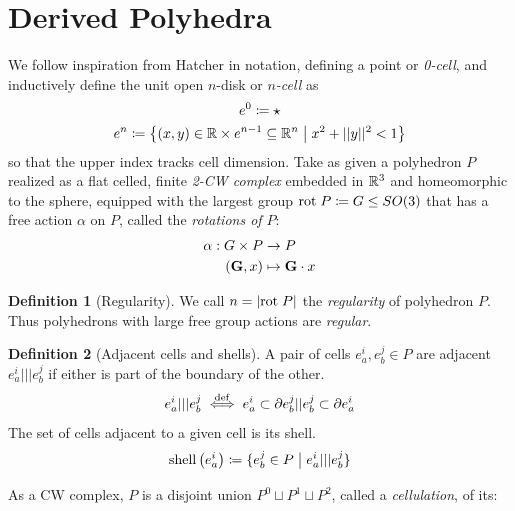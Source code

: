 \documentclass{amsart}
\theoremstyle{plain}
\theoremstyle{definition}
\newtheorem*{definition}{Definition}
\begin{document}
\section{Derived Polyhedra}

We follow inspiration from Hatcher \cite{MR1867354} in notation, defining a point or \emph{0-cell}, and inductively define  the unit open $n$-disk or \emph{$n$-cell} as
\begin{gather}
    e^0\coloneqq \star\\
    e^n\coloneqq \left\{(x,y)\in \mathbb{R}\times e^{n-1}\subseteq \mathbb{R}^n\hspace{1mm}\big|\hspace{1mm} x^2+||y||^2<1\right\}
\end{gather}
so that the upper index tracks cell dimension.
Take as given a polyhedron $P$ realized as a flat celled, finite \emph{2-CW complex} embedded in $\mathbb{R}^3$ and homeomorphic to the sphere, equipped with the largest group $\mathrm{rot}\hspace{1mm}P \coloneqq G\leq SO(3)$ that has a free action $\alpha$ on $P$, called the \emph{rotations of $P$}: 
\begin{align}
    \alpha:G\times P&\to P\\
    (\mathbf{G},x)&\mapsto \mathbf{G}\cdot x\nonumber
\end{align}
\begin{definition}[Regularity]
    We call $n=|\mathrm{rot}\hspace{1mm}P|$ the \emph{regularity} of polyhedron $P$. Thus polyhedrons with large free group actions are \emph{regular}.
\end{definition}
\begin{definition}[Adjacent cells and shells]
    A pair of cells $e^i_a, e^j_b\in P$ are adjacent $e^i_a ||| e^j_b$ if either is part of the boundary of the other.
    \begin{equation}
        e^i_a ||| e^j_b \overset{\mathrm{def}}{\iff} e^i_a \subset \partial e^j_b || e^j_b\subset\partial e^i_a
    \end{equation}
    The set of cells adjacent to a given cell is its shell.
    \begin{equation}
        \mathrm{shell}\left(e^i_a\right)\coloneqq \{e^j_b\in P\hspace{1mm}\big|\hspace{1mm} e^i_a|||e^j_b\}
    \end{equation}
\end{definition}
As a CW complex, $P$ is a disjoint union $P^0\sqcup P^1\sqcup P^2$, called a \emph{cellulation}, of its:
\end{document}
